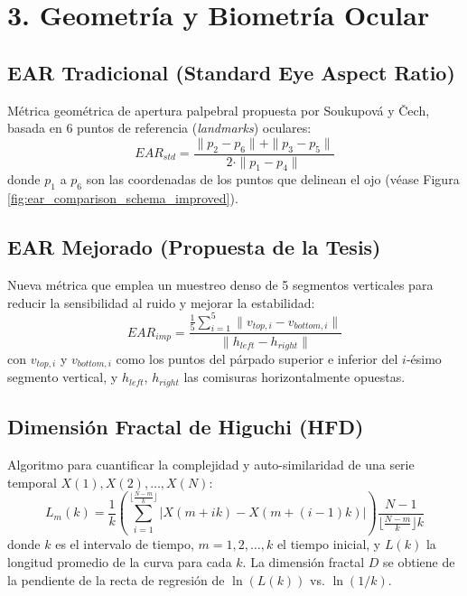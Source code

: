 \section*{3. Geometría y Biometría Ocular}

\subsection*{EAR Tradicional (Standard Eye Aspect Ratio)}
Métrica geométrica de apertura palpebral propuesta por Soukupová y Čech, basada en 6 puntos de referencia (\textit{landmarks}) oculares:
\begin{equation}
	EAR_{std} = \frac{\|p_2 - p_6\| + \|p_3 - p_5\|}{2 \cdot \|p_1 - p_4\|}
	\label{eq:anexo_ear_std}
\end{equation}
donde $p_1$ a $p_6$ son las coordenadas de los puntos que delinean el ojo (véase Figura \ref{fig:ear_comparison_schema_improved}).

\subsection*{EAR Mejorado (Propuesta de la Tesis)}
Nueva métrica que emplea un muestreo denso de 5 segmentos verticales para reducir la sensibilidad al ruido y mejorar la estabilidad:
\begin{equation}
	EAR_{imp} = \frac{\frac{1}{5} \sum_{i=1}^{5} \|v_{top,i} - v_{bottom,i}\|}{\|h_{left} - h_{right}\|}
	\label{eq:anexo_ear_imp}
\end{equation}
con $v_{top,i}$ y $v_{bottom,i}$ como los puntos del párpado superior e inferior del $i$-ésimo segmento vertical, y $h_{left}$, $h_{right}$ las comisuras horizontalmente opuestas.

\subsection*{Dimensión Fractal de Higuchi (HFD)}
Algoritmo para cuantificar la complejidad y auto-similaridad de una serie temporal $X(1), X(2), \dots, X(N)$:
\begin{equation}
	L_m(k) = \frac{1}{k} \left( \sum_{i=1}^{\lfloor \frac{N-m}{k} \rfloor} |X(m+ik) - X(m+(i-1)k)| \right) \frac{N-1}{\lfloor \frac{N-m}{k} \rfloor k}
	\label{eq:anexo_hfd}
\end{equation}
donde $k$ es el intervalo de tiempo, $m = 1,2,\dots,k$ el tiempo inicial, y $L(k)$ la longitud promedio de la curva para cada $k$. La dimensión fractal $D$ se obtiene de la pendiente de la recta de regresión de $\ln(L(k))$ vs. $\ln(1/k)$.


